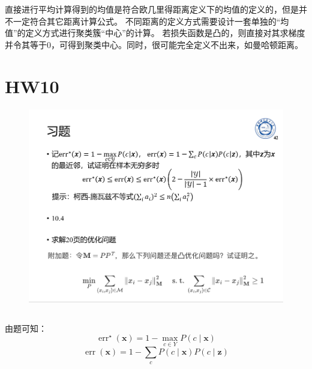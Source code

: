 \documentclass[UTF8,a4paper,AutoFakeBold,AutoFakeSlant]{article}
\begin{document}
直接进行平均计算得到的均值是符合欧几里得距离定义下的均值的定义的，但是并不一定符合其它距离计算公式。
不同距离的定义方式需要设计一套单独的“均值”的定义方式进行聚类簇“中心”的计算。
若损失函数是凸的，则直接对其求梯度并令其等于0，可得到聚类中心。同时，很可能完全定义不出来，如曼哈顿距离。






\section{HW10}

\begin{figure}[H]
  \centering
  \includegraphics[scale=0.325]{hw10.png}
  \label{f10}
\end{figure}



\subsection{}

由题可知：
\begin{equation*}
  \operatorname{err}^{\star}(\boldsymbol{x})=1-\max _{c \in Y} P(c \mid \boldsymbol{x})
\end{equation*}
\begin{equation*}
  \operatorname{err}(\boldsymbol{x})=1-\sum_{c} P(c \mid \boldsymbol{x}) P(c \mid \boldsymbol{z})
\end{equation*}
\end{document}

